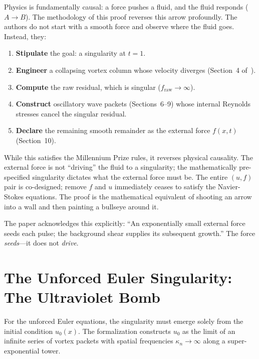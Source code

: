 \documentclass[11pt,a4paper]{article}
\begin{document}
Physics is fundamentally causal: a force pushes a fluid, and the fluid responds ($A \to B$). The
methodology of this proof reverses this arrow profoundly. The authors do not start with a smooth
force and observe where the fluid goes. Instead, they:
\begin{enumerate}
  \item \textbf{Stipulate} the goal: a singularity at $t = 1$.
  \item \textbf{Engineer} a collapsing vortex column whose velocity diverges
        (Section~4 of~\cite{OpenAI2026}).
  \item \textbf{Compute} the raw residual, which is singular ($f_{\text{raw}} \to \infty$).
  \item \textbf{Construct} oscillatory wave packets (Sections~6--9) whose internal Reynolds
        stresses cancel the singular residual.
  \item \textbf{Declare} the remaining smooth remainder as the external force $f(x,t)$
        (Section~10).
\end{enumerate}

While this satisfies the Millennium Prize rules, it reverses physical causality. The external force
is not ``driving'' the fluid to a singularity; the mathematically pre-specified singularity
dictates what the external force must be. The entire $(u, f)$ pair is co-designed; remove $f$ and
$u$ immediately ceases to satisfy the Navier-Stokes equations. The proof is the mathematical
equivalent of shooting an arrow into a wall and then painting a bullseye around it.

The paper acknowledges this explicitly: ``An exponentially small external force seeds each pulse;
the background shear supplies its subsequent growth.'' The force \emph{seeds}---it does not
\emph{drive}.

\section{The Unforced Euler Singularity: The Ultraviolet Bomb}

For the unforced Euler equations, the singularity must emerge solely from the initial condition
$u_0(x)$. The formalization constructs $u_0$ as the limit of an infinite series of vortex packets
with spatial frequencies $\kappa_n \to \infty$ along a super-exponential tower.
\end{document}
